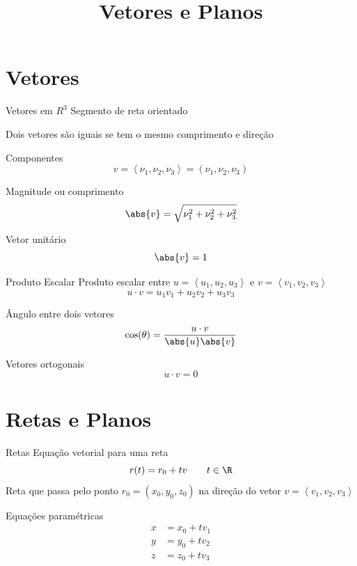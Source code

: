 
\usepackage{calculo_varias_variaveis-1}

\title{Vetores e Planos}



\addtitle

\section{Vetores}

\begin{frame}{Vetores em $R^3$}
  Segmento de reta orientado

  \pause
  Dois vetores são iguais se tem o mesmo comprimento e direção

  \pause
  Componentes
  \[
    v
    = \left< \nu_1, \nu_2, \nu_3 \right>
    = \left( \nu_1, \nu_2, \nu_3 \right)
  \]

  \pause
  Magnitude ou comprimento
  \[
    \abs{v} = \sqrt{\nu_1^2 + \nu_2^2 + \nu_3^2}
  \]

  \pause
  Vetor unitário
  \[
    \abs{v} = 1
  \]
\end{frame}

\begin{frame}{Produto Escalar}
  Produto escalar entre
  \(u=\left<u_1, u_2, u_3\right>\) e
  \(v=\left<v_1, v_2, v_3\right>\)
  \[
    u\cdot v = u_1v_1 + u_2v_2 + u_3v_3
  \]

  \pause
  Ângulo entre dois vetores
  \[
    \cos(\theta) = \frac{u\cdot v}{\abs{u}\abs{v}}
  \]

  \pause
  Vetores ortogonais
  \[
    u\cdot v = 0
  \]
  \end{frame}

\section{Retas e Planos}

\begin{frame}{Retas}
  Equação vetorial para uma reta
  \[
    r(t) = r_0 + tv
    \qquad
    t\in\R
  \]
  Reta que passa pelo ponto \(r_0=\left(x_0, y_0, z_0\right)\)
  na direção do vetor \(v=\left<v_1, v_2, v_3\right>\)

  \pause
  \vspace{\baselineskip}
  Equações paramétricas
  \begin{align*}
    x & = x_0 + tv_1 \\
    y & = y_0 + tv_2 \\
    z & = z_0 + tv_3 \\
  \end{align*}
\end{frame}

